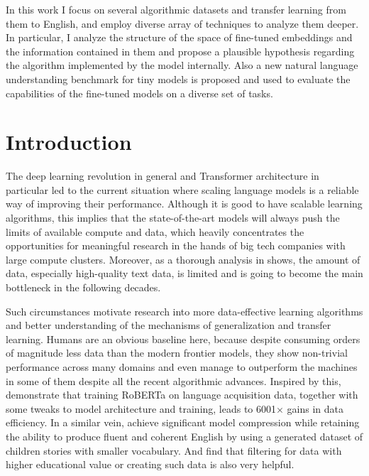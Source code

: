 \documentclass[a4paper, 11pt, oneside]{article}
\begin{document}
	In this work I focus on several algorithmic datasets and transfer learning
	from them to English, and employ diverse array of techniques to analyze them deeper.
	In particular, I analyze the structure of the space of fine-tuned embeddings and
	the information contained in them and propose a plausible hypothesis regarding
	the algorithm implemented by the model internally. Also a new natural language
	understanding benchmark for tiny models is proposed and used to evaluate the
	capabilities of the fine-tuned models on a diverse set of tasks.
	\newpage
	\tableofcontents

	\clearpage

	\section{Introduction}

	The deep learning revolution in general and Transformer
	\cite{vaswani2017attention} architecture in particular led to the current
	situation where scaling language models is a reliable way of improving their
	performance. Although it is good to have scalable learning algorithms, this
	implies that the state-of-the-art models will always push the limits of
	available compute and data, which heavily concentrates the opportunities for meaningful
	research in the hands of big tech companies with large compute clusters.
	Moreover, as a thorough analysis in \cite{villalobos2022will} shows, the
	amount of data, especially high-quality text data, is limited and is going to
	become the main bottleneck in the following decades.

	Such circumstances motivate research into more data-effective learning
	algorithms and better understanding of the mechanisms of generalization and
	transfer learning. Humans are an obvious baseline here, because despite
	consuming orders of magnitude less data than the modern frontier models, they show
	non-trivial performance across many domains and even manage to outperform the machines
	in some of them despite all the recent algorithmic advances. Inspired by this,
	\citet{huebner2021babyberta} demonstrate that training RoBERTa
	\cite{liu2019roberta} on language acquisition data, together with some tweaks to
	model architecture and training, leads to 6001$\times$ gains in data efficiency.
	In a similar vein, \citet{eldan2023tinystories} achieve significant model
	compression while retaining the ability to produce fluent and coherent English
	by using a generated dataset of children stories with smaller vocabulary. And \citet{gunasekar2023textbooks}
	find that filtering for data with higher educational value or creating such
	data is also very helpful.
\end{document}
